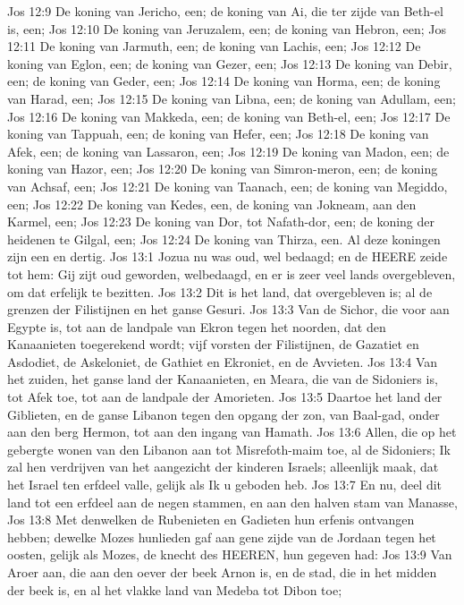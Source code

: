 Jos 12:9  De koning van Jericho, een; de koning van Ai, die ter zijde van Beth-el is, een;
Jos 12:10  De koning van Jeruzalem, een; de koning van Hebron, een;
Jos 12:11  De koning van Jarmuth, een; de koning van Lachis, een;
Jos 12:12  De koning van Eglon, een; de koning van Gezer, een;
Jos 12:13  De koning van Debir, een; de koning van Geder, een;
Jos 12:14  De koning van Horma, een; de koning van Harad, een;
Jos 12:15  De koning van Libna, een; de koning van Adullam, een;
Jos 12:16  De koning van Makkeda, een; de koning van Beth-el, een;
Jos 12:17  De koning van Tappuah, een; de koning van Hefer, een;
Jos 12:18  De koning van Afek, een; de koning van Lassaron, een;
Jos 12:19  De koning van Madon, een; de koning van Hazor, een;
Jos 12:20  De koning van Simron-meron, een; de koning van Achsaf, een;
Jos 12:21  De koning van Taanach, een; de koning van Megiddo, een;
Jos 12:22  De koning van Kedes, een, de koning van Jokneam, aan den Karmel, een;
Jos 12:23  De koning van Dor, tot Nafath-dor, een; de koning der heidenen te Gilgal, een;
Jos 12:24  De koning van Thirza, een. Al deze koningen zijn een en dertig.
Jos 13:1  Jozua nu was oud, wel bedaagd; en de HEERE zeide tot hem: Gij zijt oud geworden, welbedaagd, en er is zeer veel lands overgebleven, om dat erfelijk te bezitten.
Jos 13:2  Dit is het land, dat overgebleven is; al de grenzen der Filistijnen en het ganse Gesuri.
Jos 13:3  Van de Sichor, die voor aan Egypte is, tot aan de landpale van Ekron tegen het noorden, dat den Kanaanieten toegerekend wordt; vijf vorsten der Filistijnen, de Gazatiet en Asdodiet, de Askeloniet, de Gathiet en Ekroniet, en de Avvieten.
Jos 13:4  Van het zuiden, het ganse land der Kanaanieten, en Meara, die van de Sidoniers is, tot Afek toe, tot aan de landpale der Amorieten.
Jos 13:5  Daartoe het land der Giblieten, en de ganse Libanon tegen den opgang der zon, van Baal-gad, onder aan den berg Hermon, tot aan den ingang van Hamath.
Jos 13:6  Allen, die op het gebergte wonen van den Libanon aan tot Misrefoth-maim toe, al de Sidoniers; Ik zal hen verdrijven van het aangezicht der kinderen Israels; alleenlijk maak, dat het Israel ten erfdeel valle, gelijk als Ik u geboden heb.
Jos 13:7  En nu, deel dit land tot een erfdeel aan de negen stammen, en aan den halven stam van Manasse,
Jos 13:8  Met denwelken de Rubenieten en Gadieten hun erfenis ontvangen hebben; dewelke Mozes hunlieden gaf aan gene zijde van de Jordaan tegen het oosten, gelijk als Mozes, de knecht des HEEREN, hun gegeven had:
Jos 13:9  Van Aroer aan, die aan den oever der beek Arnon is, en de stad, die in het midden der beek is, en al het vlakke land van Medeba tot Dibon toe;
